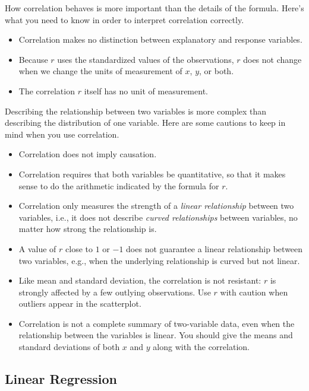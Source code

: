 How correlation behaves is more important than the details of the formula. Here's what you need to know in order to interpret correlation correctly.

\begin{itemize}[itemsep=0cm]
\item Correlation makes no distinction between explanatory and response variables.
\item Because $r$ uses the standardized values of the observations, $r$ does not change when we change the units of measurement of $x$, $y$, or both.
\item The correlation $r$ itself has no unit of measurement.
\end{itemize}

Describing the relationship between two variables is more complex than describing the distribution of one variable. Here are some cautions to keep in mind when you use correlation.

\begin{itemize}[itemsep=0cm]
\item Correlation does not imply causation.
\item Correlation requires that both variables be quantitative, so that it makes sense to do the arithmetic indicated by the formula for $r$.
\item Correlation only measures the strength of a \textit{linear relationship} between two variables, i.e., it does not describe \textit{curved relationships} between variables, no matter how strong the relationship is.
\item A value of $r$ close to $1$ or $-1$ does not guarantee a linear relationship between two variables, e.g., when the underlying relationship is curved but not linear.
\item Like mean and standard deviation, the correlation is not resistant: $r$ is strongly affected by a few outlying observations. Use $r$ with caution when outliers appear in the scatterplot.
\item Correlation is not a complete summary of two-variable data, even when the relationship between the variables is linear. You should give the means and standard deviations of both $x$ and $y$ along with the correlation.
\end{itemize}

\subsection{Linear Regression}

